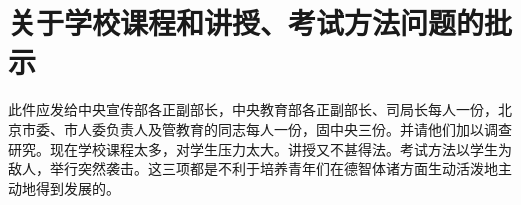 \section[关于学校课程和讲授、考试方法问题的批示（在北京铁路二中调查材料的批示）（一九六四年三月十日）]{关于学校课程和讲授、考试方法问题的批示}


此件应发给中央宣传部各正副部长，中央教育部各正副部长、司局长每人一份，北京市委、市人委负责人及管教育的同志每人一份，固中央三份。并请他们加以调查研究。现在学校课程太多，对学生压力太大。讲授又不甚得法。考试方法以学生为敌人，举行突然袭击。这三项都是不利于培养青年们在德智体诸方面生动活泼地主动地得到发展的。



